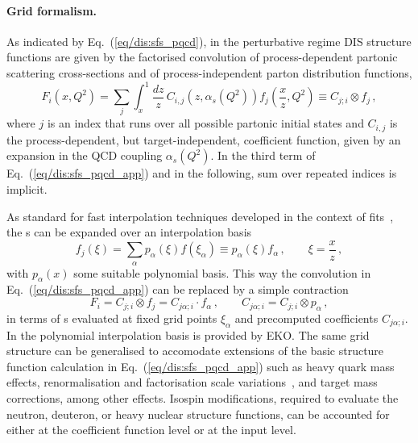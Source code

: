 \paragraph{Grid formalism.}
%
As indicated by Eq.~(\ref{eq/dis:sfs_pqcd}), in the perturbative regime DIS
structure functions are given by the factorised convolution of
process-dependent partonic scattering cross-sections and of process-independent
parton distribution functions,
\begin{equation}
\label{eq/dis:sfs_pqcd_app}
F_i(x,Q^2) = \sum_{j}\int_x^1 \frac{dz}{z}\, C_{i,j}(z,\alpha_s(Q^2))f_j\left( \frac{x}{z},Q^2\right) \equiv
C_{j; i} \otimes f_j\, ,
 \end{equation}
 where $j$ is an index that runs over all possible partonic initial states and
 $C_{i,j}$ is the process-dependent, but target-independent, coefficient
 function, given by an expansion in the QCD coupling $\alpha_s(Q^2)$.
 In the third term of Eq.~(\ref{eq/dis:sfs_pqcd_app}) and in the following, sum
 over repeated indices is implicit.
 
As standard for fast interpolation techniques developed in the context of \pdf{}
fits~\cite{Carli:2010rw,Carrazza:2020gss,Wobisch:2011ij,Bertone:2014zva}, the
\pdf{}s can be expanded over an interpolation basis \begin{equation}
f_j(\xi) = \sum_\alpha p_\alpha(\xi) f(\xi_\alpha) \equiv p_\alpha(\xi) f_\alpha \, ,
\qquad \xi = \frac x z \, ,
\end{equation}
with $p_\alpha(x)$ some suitable polynomial basis.
%
This way the convolution in Eq.~(\ref{eq/dis:sfs_pqcd_app}) can be replaced by
a simple contraction
\begin{equation}
\label{app/dis:grid_formalism}
F_i = C_{j; i} \otimes f_j = C_{j \alpha; i} \cdot f_\alpha \, ,\qquad
C_{j \alpha; i} = C_{j; i} \otimes p_\alpha \, ,
\end{equation}
in terms of \pdf{}s evaluated at fixed grid points $\xi_\alpha$ and precomputed
coefficients $C_{j \alpha; i}$.
%
In \yadism the polynomial interpolation basis is  provided by \textsc{\small
EKO}.
%
The same grid structure can be generalised to accomodate extensions of the
basic structure function calculation in Eq.~(\ref{eq/dis:sfs_pqcd_app}) such as
heavy quark mass effects, renormalisation and factorisation scale
variations~\cite{NNPDF:2019vjt,NNPDF:2019ubu}, and target mass corrections,
among other effects.
%
Isospin modifications, required to evaluate the neutron, deuteron, or heavy
nuclear structure functions, can be accounted for either at the coefficient
function level or at the input \pdf{} level.

